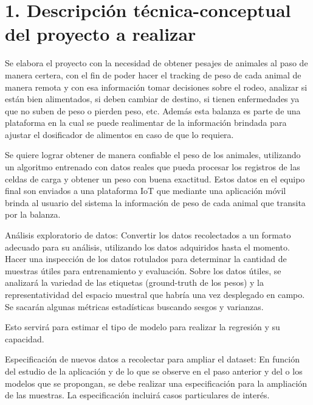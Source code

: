 \documentclass[
11pt, %
codirector, %
]{charter}
\begin{document}
\section{1. Descripción técnica-conceptual del proyecto a realizar}
\label{sec:descripcion}


Se elabora el proyecto con la necesidad de obtener pesajes de animales al paso de manera certera, con el fin de poder hacer el tracking de peso de cada animal de manera remota y con esa información tomar decisiones sobre el rodeo, analizar si están bien alimentados, si deben cambiar de destino, si tienen enfermedades ya que no suben de peso o pierden peso, etc.
Además esta balanza es parte de una plataforma en la cual se puede realimentar de la información brindada para ajustar el dosificador de alimentos en caso de que lo requiera.

Se quiere lograr obtener de manera confiable el peso de los animales, utilizando un algoritmo entrenado con datos reales que pueda procesar los registros de las celdas de carga y obtener un peso con buena exactitud.
Estos datos en el equipo final son enviados a una plataforma IoT que mediante una aplicación móvil brinda al usuario del sistema la información de peso de cada animal que transita por la balanza.

Análisis exploratorio de datos:
Convertir los datos recolectados a un formato adecuado para su análisis, utilizando los datos adquiridos hasta el momento. Hacer una inspección de los datos rotulados para determinar la cantidad de muestras útiles para entrenamiento y evaluación. Sobre los datos útiles, se analizará la variedad de las etiquetas (ground-truth de los pesos) y la representatividad del espacio muestral que habría una vez desplegado en campo. Se sacarán algunas métricas estadísticas buscando sesgos y varianzas.

Esto servirá para estimar el tipo de modelo para realizar la regresión y su capacidad.

Especificación de nuevos datos a recolectar para ampliar el dataset:
En función del estudio de la aplicación y de lo que se observe en el paso anterior y del o los modelos que se propongan, se debe realizar una especificación para la ampliación de las muestras. La especificación incluirá casos particulares de interés.
\end{document}

